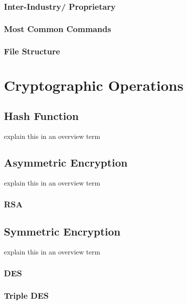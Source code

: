\documentclass[bsc,frontabs,twoside,singlespacing,parskip,deptreport]{infthesis}     %
\begin{document}
\subsection{Inter-Industry/ Proprietary}
\subsection{Most Common Commands}
\subsection{File Structure}






\chapter{Cryptographic Operations}

\section{Hash Function}

\noindent explain this in an overview term



\section{Asymmetric Encryption}

\noindent explain this in an overview term

\subsection{RSA}

\section{Symmetric Encryption}

\noindent explain this in an overview term

\subsection{DES}
\subsection{Triple DES}
\end{document}
